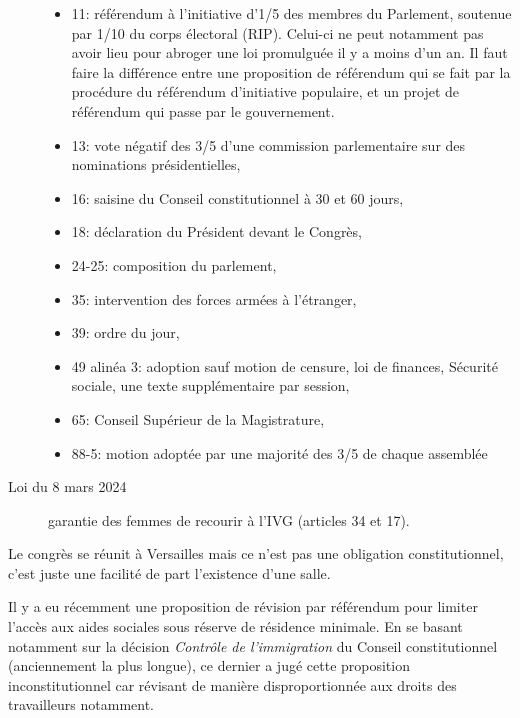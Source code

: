 \documentclass[math]{cours}
\begin{document}
\begin{description}
\begin{itemize}
			\item 11: référendum à l'initiative d'1/5 des membres du Parlement, soutenue par 1/10 du corps électoral (RIP).
				Celui-ci ne peut notamment pas avoir lieu pour abroger une loi promulguée il y a moins d'un an.
				Il faut faire la différence entre une proposition de référendum qui se fait par la procédure du référendum d'initiative populaire, et un projet de référendum qui passe par le gouvernement.
			\item 13: vote négatif des 3/5 d'une commission parlementaire sur des nominations présidentielles,
			\item 16: saisine du Conseil constitutionnel à 30 et 60 jours,
			\item 18: déclaration du Président devant le Congrès,
			\item 24-25: composition du parlement,
			\item 35: intervention des forces armées à l'étranger,
			\item 39: ordre du jour,
			\item 49 alinéa 3: adoption sauf motion de censure, loi de finances, Sécurité sociale, une texte supplémentaire par session,
			\item 65: Conseil Supérieur de la Magistrature,
			\item 88-5: motion adoptée par une majorité des 3/5 de chaque assemblée
		\end{itemize}
	\item[Loi du 8 mars 2024] garantie des femmes de recourir à l'IVG (articles 34 et 17).
\end{description}
Le congrès se réunit à Versailles mais ce n'est pas une obligation constitutionnel, c'est juste une facilité de part l'existence d'une salle.

Il y a eu récemment une proposition de révision par référendum pour limiter l'accès aux aides sociales sous réserve de résidence minimale.
En se basant notamment sur la décision \emph{Contrôle de l'immigration} du Conseil constitutionnel (anciennement la plus longue), ce dernier a jugé cette proposition inconstitutionnel car révisant de manière disproportionnée aux droits des travailleurs notamment.
\end{document}
